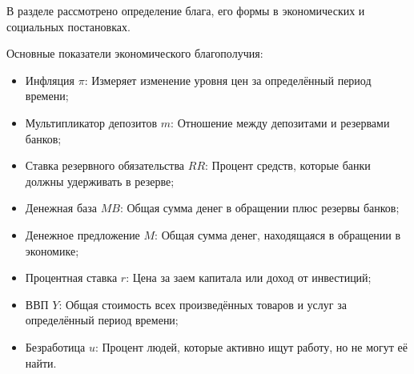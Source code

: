 В разделе рассмотрено определение блага, его формы в экономических и социальных постановках.

Основные показатели экономического благополучия:
\begin{itemize}
    \item Инфляция $\pi$: Измеряет изменение уровня цен за определённый период времени;
    \item Мультипликатор депозитов $m$: Отношение между депозитами и резервами банков;
    \item Ставка резервного обязательства $RR$: Процент средств, которые банки должны удерживать в резерве;
    \item Денежная база $MB$: Общая сумма денег в обращении плюс резервы банков;
    \item Денежное предложение $M$: Общая сумма денег, находящаяся в обращении в экономике;
    \item Процентная ставка $r$: Цена за заем капитала или доход от инвестиций;
    \item ВВП $Y$: Общая стоимость всех произведённых товаров и услуг за определённый период времени;
    \item Безработица $u$: Процент людей, которые активно ищут работу, но не могут её найти.
\end{itemize}



